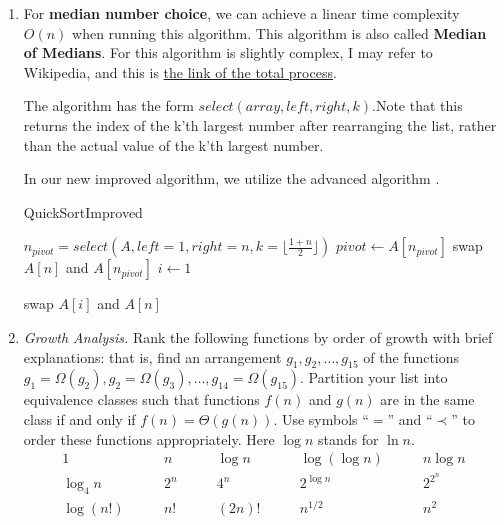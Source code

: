 \documentclass[12pt,a4paper]{article}
\makeatletter
\newtheorem*{solution}{Solution}
\theoremstyle{definition}
\renewenvironment{solution}[1][Solution] {\par\pushQED{\qed}\normalfont\topsep6\p@\@plus6\p@\relax\trivlist\item[\hskip\labelsep\bfseries#1\@addpunct{.}]\ignorespaces}{\popQED\endtrivlist\@endpefalse} \makeatother
\makeatother
\begin{document}
\begin{enumerate}
\begin{solution}
For \textbf{median number choice}, we can achieve a linear time complexity $O(n)$ when running this algorithm. This algorithm is also called \textbf{Median of Medians}. For this algorithm is slightly complex, I may refer to Wikipedia, and this is \href{https://en.wikipedia.org/wiki/Median_of_medians#Proof_of_O(n)_running_time}{the link of the total process}.
		
The algorithm has the form $select(array, left, right, k)$.Note that this returns the index of the k'th largest number after rearranging the list, rather than the actual value of the k'th largest number.

In our new improved algorithm, we utilize the advanced algorithm .

\begin{algorithm}[H]
		
		\BlankLine
		\caption{QuickSortImproved}\label{Alg-quicksort2}
		
		$n_{pivot} =  select(A, left=1, right=n, k=\lfloor \frac{1+n}{2}\rfloor)$ \;
		$pivot \leftarrow A[n_{pivot}]$\; 
		swap $A[n]$ and $A[n_{pivot}]$\;
		$i \leftarrow 1$\;
		
		swap $A[i]$ and $A[n]$\;
	\end{algorithm}





    \end{solution}


\item \textit{Growth Analysis.} Rank the following functions by order of growth with brief explanations: that is, find an arrangement $g_1, g_2, \ldots , g_{15}$ of the functions $g_1 = \Omega(g_2), g_2 = \Omega(g_3), \ldots, g_{14} = \Omega(g_{15})$.  Partition your list into equivalence classes such that functions $f(n)$ and $g(n)$ are in the same class if and only if $f(n) = \Theta(g(n))$. Use symbols ``$=$'' and ``$\prec$'' to order these functions appropriately. Here $\log n$ stands for $\ln n$.
$$
\begin{array}{ccccc}
	1 \quad & \quad n \quad & \quad \log n \quad & \quad \log (\log n) \quad & \quad n \log n \\
	\log_4 n \quad & \quad 2^n \quad & \quad 4^n \quad & \quad 2^{\log n} \quad & \quad 2^{2^n} \\
	\log (n!) \quad & \quad n! \quad & \quad (2n)! \quad & \quad  n^{1/2} \quad & \quad n^2 \\
\end{array}
$$


\end{enumerate}
\end{document}

